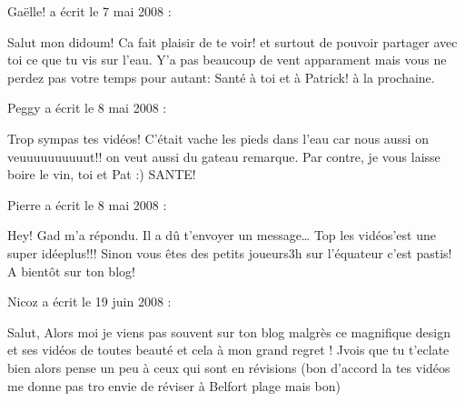 \medskip
Gaëlle! a écrit le 7 mai 2008 :
\begin{displayquote}
Salut mon didoum!
Ca fait plaisir de te voir! et surtout de pouvoir partager avec toi ce que tu vis sur l'eau.
Y'a pas beaucoup de vent apparament mais vous ne perdez pas votre temps pour autant: Santé à toi et à Patrick!
à la prochaine.
\end{displayquote}

\medskip
Peggy a écrit le 8 mai 2008 :
\begin{displayquote}
Trop sympas tes vidéos!
C'était vache les pieds dans l'eau car nous aussi on veuuuuuuuuuut!! on veut aussi du gateau remarque.
Par contre, je vous laisse boire le vin, toi et Pat :) SANTE!
\end{displayquote}

\medskip
Pierre a écrit le 8 mai 2008 :
\begin{displayquote}
Hey!
Gad m'a répondu. Il a dû t'envoyer un message\dots
Top les vidéos\dotsc'est une super idée\dotsfaisant plus!!!
Sinon vous êtes des petits joueurs 3h sur l'équateur c'est pastis!
A bientôt sur ton blog!
\end{displayquote}

\medskip
Nicoz a écrit le 19 juin 2008 :
\begin{displayquote}
Salut,
Alors moi je viens pas souvent sur ton blog malgrès ce magnifique design et ses vidéos de toutes beauté et cela à mon grand regret !
Jvois que tu t'eclate bien alors pense un peu à ceux qui sont en révisions (bon d'accord la tes vidéos me donne pas tro envie de réviser à Belfort plage mais bon)
\end{displayquote}

\vfill
